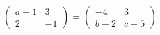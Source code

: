 \hspace*{2mm}\begin{minipage}[t]{\dimexpr\linewidth-2mm\relax}\vspace{0pt}
$\begin{pmatrix} a-1 & 3 \\ 2 & -1 \end{pmatrix}=\begin{pmatrix} -4 & 3 \\ b-2 & c-5 \end{pmatrix}$\end{minipage}
